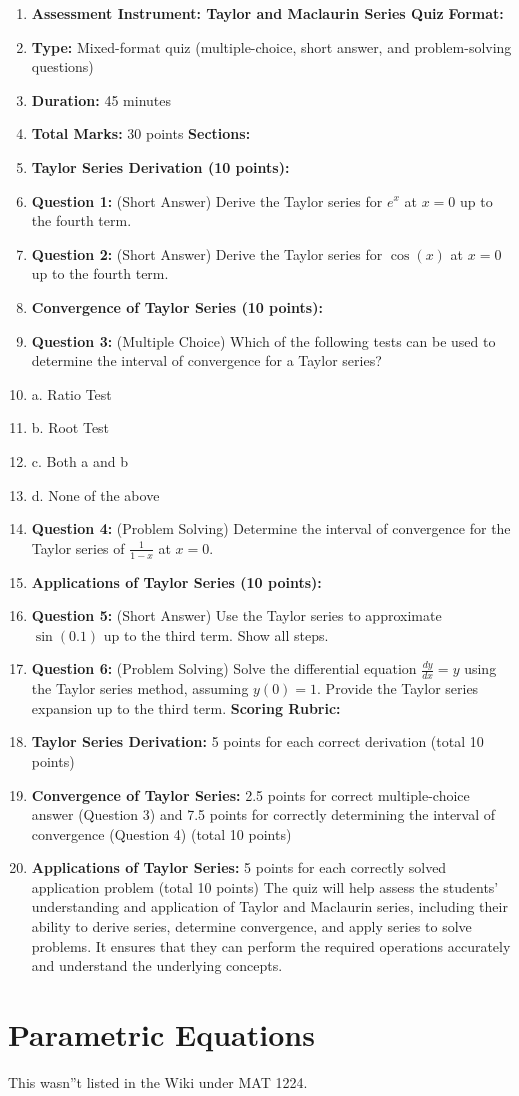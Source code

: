 \begin{enumerate}
    \item \textbf{Assessment Instrument: Taylor and Maclaurin Series Quiz} \textbf{Format:}
    \item \textbf{Type:} Mixed-format quiz (multiple-choice, short answer, and problem-solving questions)
    \item \textbf{Duration:} 45 minutes
    \item \textbf{Total Marks:} 30 points \textbf{Sections:}
    \item \textbf{Taylor Series Derivation (10 points):}
    \item \textbf{Question 1:} (Short Answer) Derive the Taylor series for $e^x$ at $x=0$ up to the fourth term.
    \item \textbf{Question 2:} (Short Answer) Derive the Taylor series for $\cos(x)$ at $x=0$ up to the fourth term.
    \item \textbf{Convergence of Taylor Series (10 points):}
    \item \textbf{Question 3:} (Multiple Choice) Which of the following tests can be used to determine the interval of convergence for a Taylor series?
    \item a. Ratio Test
    \item b. Root Test
    \item c. Both a and b
    \item d. None of the above
    \item \textbf{Question 4:} (Problem Solving) Determine the interval of convergence for the Taylor series of $\frac{1}{1-x}$ at $x=0$.
    \item \textbf{Applications of Taylor Series (10 points):}
    \item \textbf{Question 5:} (Short Answer) Use the Taylor series to approximate $\sin(0.1)$ up to the third term. Show all steps.
    \item \textbf{Question 6:} (Problem Solving) Solve the differential equation $\frac{dy}{dx} = y$ using the Taylor series method, assuming $y(0)=1$. Provide the Taylor series expansion up to the third term. \textbf{Scoring Rubric:}
    \item \textbf{Taylor Series Derivation:} 5 points for each correct derivation (total 10 points)
    \item \textbf{Convergence of Taylor Series:} 2.5 points for correct multiple-choice answer (Question 3) and 7.5 points for correctly determining the interval of convergence (Question 4) (total 10 points)
    \item \textbf{Applications of Taylor Series:} 5 points for each correctly solved application problem (total 10 points) The quiz will help assess the students' understanding and application of Taylor and Maclaurin series, including their ability to derive series, determine convergence, and apply series to solve problems. It ensures that they can perform the required operations accurately and understand the underlying concepts.
\end{enumerate}

\section{Parametric Equations}
\label{sec:parametric-equations}

This wasn''t listed in the Wiki under MAT 1224.
